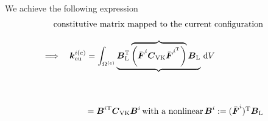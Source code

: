 We achieve the following expression\\
\begin{equation}
\begin{array}{lccc}
& \multicolumn{2}{l}{\text{constitutive matrix mapped to the current
    configuration}} & \\
& & & \\
\multicolumn{2}{l}{\Longrightarrow\quad \vct{k}_\text{eu}^{i(e)} = \displaystyle\int_{\Omega^{(e)}}
  \underbrace{\vct{B}_\text{L}^{\T} \overbrace{ \left ( \bar{\vct{F}}^{i} \mat{C}_\VK
  \bar{\vct{F}}^{i^{\T}} \right )}\vct{B}_\text{L}}  \, \dd V} & & \\
& & & \\[6ex]
& \multicolumn{2}{l}{\qquad \qquad = \vct{B}^{i\T} \mat{C}_\VK \vct{B}^{i} \, \text{with a
    nonlinear} \, \vct{B}^{i} := (\barmat{F}^{i})^{\T} \vct{B}_\text{L}} & 
\end{array} 
\end{equation}

